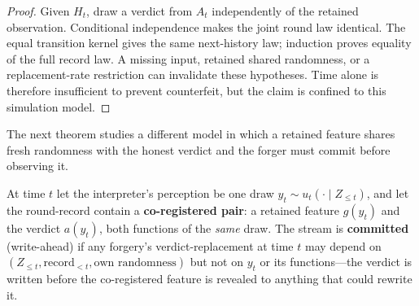 \begin{proof}

Given \(H_t\), draw a verdict from \(A_t\) independently of the retained observation. Conditional independence makes the joint round law identical. The equal transition kernel gives the same next-history law; induction proves equality of the full record law. A missing input, retained shared randomness, or a replacement-rate restriction can invalidate these hypotheses. Time alone is therefore insufficient to prevent counterfeit, but the claim is confined to this simulation model.
\end{proof}

The next theorem studies a different model in which a retained feature shares fresh randomness with the honest verdict and the forger must commit before observing it.

\begin{thmdef}

At time \(t\) let the interpreter's perception be one draw \(y_t \sim u_t(\cdot \mid Z_{\le t})\), and let the round-record contain a \textbf{co-registered pair}: a retained feature \(g(y_t)\) and the verdict \(a(y_t)\), both functions of the \emph{same} draw. The stream is \textbf{committed} (write-ahead) if any forgery's verdict-replacement at time \(t\) may depend on \((Z_{\le t}, \text{record}_{<t}, \text{own randomness})\) but not on \(y_t\) or its functions---\hspace{0pt}the verdict is written before the co-registered feature is revealed to anything that could rewrite it.
\end{thmdef}


